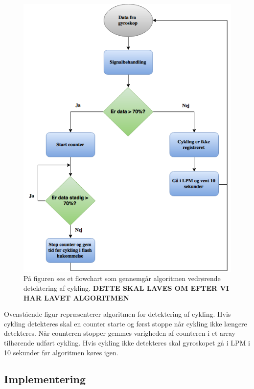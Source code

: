 \begin{figure}[H]
	\centering
	\includegraphics[scale=0.6]{figures/cDesign/algoritme_cykling.png}
	\caption{På figuren ses et flowchart som gennemgår algoritmen vedrørende detektering af cykling. \textbf{DETTE SKAL LAVES OM EFTER VI HAR LAVET ALGORITMEN}}
	\label{fig:algoritme_cykling}
\end{figure}

Ovenstående figur repræsenterer algoritmen for detektering af cykling. Hvis cykling detekteres skal en counter starte og først stoppe når cykling ikke længere detekteres. Når counteren stopper gemmes varigheden af counteren i et array tilhørende udført cykling. Hvis cykling ikke detekteres skal gyroskopet gå i LPM i 10 sekunder før algoritmen køres igen. 


\subsection{Implementering}
